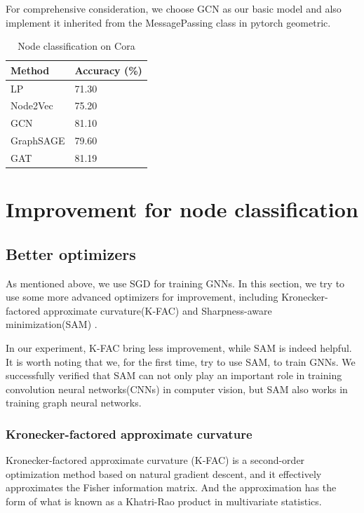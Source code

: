 \documentclass[fleqn,10pt]{SelfArx} %
\begin{document}
For comprehensive consideration, we choose GCN as our basic model and also implement it inherited from the MessagePassing class in pytorch geometric.

\begin{table}
	\centering
	\begin{tabular}{ll}
		\toprule
		Method &    Accuracy (\%) \\
		\midrule
		LP & 71.30  \\
		Node2Vec  & 75.20\\
		GCN & 81.10 \\
		GraphSAGE & 79.60 \\
		GAT & 81.19 \\
		\bottomrule
	\end{tabular}
\caption{Node classification on Cora}
\label{node-cls}
\end{table}

\section{Improvement for node classification}
\subsection{Better optimizers}

As mentioned above, we use SGD for training GNNs. In this section, we try to use some more advanced optimizers for improvement, including 
Kronecker-factored approximate curvature(K-FAC)\cite{martens2015optimizing} and Sharpness-aware minimization(SAM)\cite{foret2020sharpness} .

In our experiment, K-FAC bring less improvement, while SAM is indeed helpful. It is worth noting that we, for the first time, try to use  SAM, to train GNNs. We successfully verified that SAM can not only play an important role in  training convolution neural networks(CNNs) in computer vision, but SAM also works in training graph neural networks. 

\subsubsection{Kronecker-factored approximate curvature}
Kronecker-factored approximate curvature (K-FAC) is a second-order optimization method based on natural gradient descent, and it effectively approximates the Fisher information 
matrix. And the approximation has the form of what is known as a Khatri-Rao product in multivariate statistics.
\end{document}
